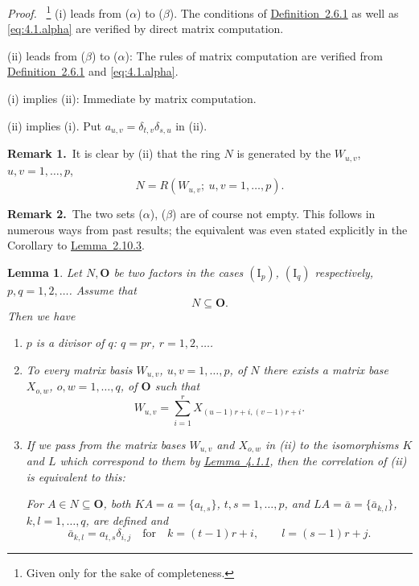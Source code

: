 \documentclass[b5paper,twoside]{article}
\newcommand{\lemref}[2]{\hyperref[#1]{\mbox{Lemma~#2}}}
\newcommand{\defref}[2]{\hyperref[#1]{\mbox{Definition~#2}}}
\theoremstyle{mvnplain}
\newtheorem{lemma}{Lemma}[section]
\renewenvironment{proof}[1][Proof]{%
  \par\addvspace{0.35\baselineskip}%
  \noindent\textit{#1.}\ \normalfont\ignorespaces
}{%
  \par\addvspace{0.35\baselineskip}%
}
\newcommand{\N}{\mathbf N}
\newcommand{\R}{\mathbf R}
\def\N{N}%
\def\R{R}%
\def\mathfrak#1{#1}%
\begin{document}
\begin{proof}\footnote{Given only for the sake of completeness.}
(i) leads from (\(\alpha\)) to (\(\beta\)). The conditions of
\defref{def:2.6.1}{2.6.1} as well as \eqref{eq:4.1.alpha} are verified by
direct matrix computation.

(ii) leads from (\(\beta\)) to (\(\alpha\)): The rules of matrix computation
are verified from \defref{def:2.6.1}{2.6.1} and \eqref{eq:4.1.alpha}.

(i) implies (ii): Immediate by matrix computation.

(ii) implies (i). Put \(a_{u,v}=\delta_{t,v}\delta_{s,u}\) in (ii).
\end{proof}

\par{}
\noindent\textbf{Remark 1.}\ 
It is clear by (ii) that the ring \(\N\) is generated by the \(W_{u,v}\),
\(u,v=1,\ldots,p\),
\[
  \N=\R(W_{u,v};\ u,v=1,\ldots,p).
\]

\noindent\textbf{Remark 2.}\ 
The two sets (\(\alpha\)), (\(\beta\)) are of course not empty. This follows
in numerous ways from past results; the equivalent was even stated explicitly
in the Corollary to \lemref{lem:2.10.3}{2.10.3}.

\begin{lemma}\label{lem:4.1.2}
Let \(\N,\mathbf O\) be two factors in the cases \((\mathrm I_p)\),
\((\mathrm I_q)\) respectively, \(p,q=1,2,\ldots\). Assume that
\[
  \N\subseteq\mathbf O.
\]
Then we have
\begin{enumerate}[label=\((\roman*)\)]
\item \(p\) is a divisor of \(q\): \(q=pr\), \(r=1,2,\ldots\).
\item To every matrix basis \(W_{u,v}\), \(u,v=1,\ldots,p\), of \(\N\)
there exists a matrix base \(X_{o,w}\), \(o,w=1,\ldots,q\), of \(\mathbf O\)
such that
\[
  W_{u,v}=\sum_{i=1}^{r}X_{(u-1)r+i,(v-1)r+i}.
\]
\item If we pass from the matrix bases \(W_{u,v}\) and \(X_{o,w}\) in (ii)
to the isomorphisms \(\mathfrak K\) and \(\mathfrak L\) which correspond to
them by \lemref{lem:4.1.1}{4.1.1}, then the correlation of (ii) is equivalent
to this:

For \(A\in\N\subseteq\mathbf O\), both
\(\mathfrak K A=a=\{a_{t,s}\}\), \(t,s=1,\ldots,p\), and
\(\mathfrak L A=\bar a=\{\bar a_{k,l}\}\), \(k,l=1,\ldots,q\), are
defined and
\[
  \bar a_{k,l}=a_{t,s}\delta_{i,j}
  \quad\text{for}\quad
  k=(t-1)r+i,\qquad l=(s-1)r+j.
\]
\end{enumerate}
\end{lemma}
\end{document}
